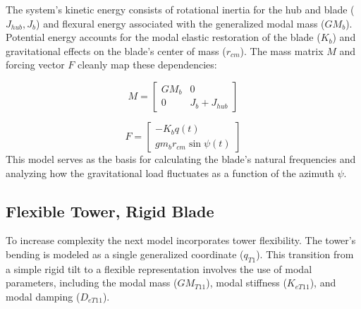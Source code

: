 \documentclass[final,onecolumn]{IEEEtran}
\begin{document}
The system's kinetic energy consists of rotational inertia for the hub and blade ($J_{hub}, J_b$) and flexural energy associated with the generalized modal mass ($GM_b$). Potential energy accounts for the modal elastic restoration of the blade ($K_b$) and gravitational effects on the blade's center of mass ($r_{cm}$). The mass matrix $M$ and forcing vector $F$ cleanly map these dependencies:

\begin{equation}
    \label{eq:flex_blade_mass_matrix} M =
    \begin{bmatrix}
        GM_{b} & 0               \\
        0      & J_{b} + J_{hub}
    \end{bmatrix}
\end{equation}

\begin{equation}
    \label{eq:flex_blade_forcing_terms} F =
    \begin{bmatrix}
        -K_{b} q(t) \\
        g m_{b} r_{cm} \sin\psi(t)
    \end{bmatrix}
\end{equation}
This model serves as the basis for calculating the blade's natural frequencies and analyzing how the gravitational load fluctuates as a function of the azimuth $\psi$.

\subsection{Flexible Tower, Rigid Blade}\label{app:flex_tower_rigid_blade}
To increase complexity the next model incorporates tower flexibility. The tower's bending is modeled as a single generalized coordinate ($q_{T1}$). This transition from a simple rigid tilt to a flexible representation involves the use of modal parameters, including the modal mass ($GM_{T11}$), modal stiffness ($K_{eT11}$), and modal damping ($D_{eT11}$).
\end{document}
